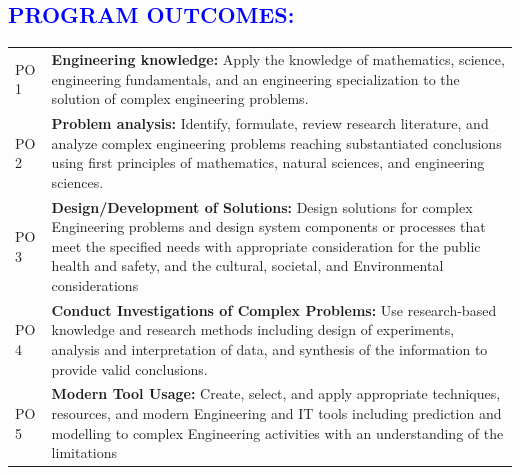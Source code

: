 \documentclass[11pt]{exam}
\begin{document}
\textcolor{blue}{\section{\large \bfseries  PROGRAM OUTCOMES: }}\vspace{-0.4cm}
\begin{flushleft}
	\begin{longtable}{|>{\centering\arraybackslash}p{1.6cm}  | >{\raggedright\arraybackslash}p{15cm}  | }
		\hline
		\multicolumn{2}{|c|}{\textbf{Program Outcomes}}  \\ \hline
		\endhead
		\hline
		PO 1&	\textbf{Engineering knowledge:} Apply the knowledge of mathematics, science, engineering fundamentals, and an engineering specialization to the solution of complex engineering problems.\\ \hline
		PO 2&	\textbf{Problem analysis:} Identify, formulate, review research literature, and analyze complex engineering problems reaching substantiated conclusions using first principles of mathematics, natural sciences, and engineering sciences.\\ \hline
		PO 3&	\textbf{Design/Development of Solutions:} Design solutions for complex Engineering problems and design system components or processes that meet the specified needs with  appropriate consideration for the public health and safety,
		and the cultural, societal, and Environmental considerations\\ \hline
		PO 4&	\textbf{Conduct Investigations of Complex Problems:} Use research-based knowledge and research methods including design of experiments, analysis and interpretation of data, and synthesis of the information to provide valid conclusions.\\ \hline
		PO 5&	\textbf{Modern Tool Usage: }Create, select, and apply appropriate techniques, resources, and modern Engineering and IT tools including prediction and modelling to complex Engineering activities with an understanding of the limitations\\ \hline
		

\end{longtable}
\end{flushleft}
\end{document}
